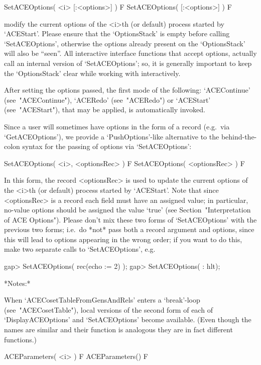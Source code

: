 \>SetACEOptions( <i> [:<options>] ) F
\>SetACEOptions( [:<options>] ) F

modify the current options of the <i>th (or default)  process  started
by `ACEStart'. Please ensure that the `OptionsStack' is  empty  before
calling `SetACEOptions', otherwise the options already present on  the
`OptionsStack' will also be ``seen''. All interactive {\ACE} interface
functions that accept options, actually call an  internal  version  of
`SetACEOptions';  so,  it  is  generally   important   to   keep   the
`OptionsStack' clear while working with {\ACE} interactively.

After setting the options passed, the first  mode  of  the  following:
`ACEContinue'  (see~"ACEContinue"),   `ACERedo'   (see~"ACERedo")   or
`ACEStart' (see~"ACEStart"), that may  be  applied,  is  automatically
invoked.

Since a user will sometimes have options  in  the  form  of  a  record
(e.g.~via   `GetACEOptions'),   we   provide   a    `PushOptions'-like
alternative to the behind-the-colon syntax for the passing of  options
via `SetACEOptions':

\>SetACEOptions( <i>, <optionsRec> ) F
\>SetACEOptions( <optionsRec> ) F

In this form, the record <optionsRec> is used to  update  the  current
options of the <i>th (or default) process started by `ACEStart'.  Note
that since <optionsRec> is a record each field must have  an  assigned
value; in particular, no-value {\ACE} options should be  assigned  the
value `true' (see Section~"Interpretation  of  ACE  Options").  Please
don't mix these two forms of `SetACEOptions'  with  the  previous  two
forms; i.e.~do *not* pass both a record argument  and  options,  since
this will lead to options appearing in the wrong order; if you want to
do this, make two separate calls to `SetACEOptions', e.g.

\beginexample
gap> SetACEOptions( rec(echo := 2) );
gap> SetACEOptions( : hlt);
\endexample

*Notes:*

When    `ACECosetTableFromGensAndRels'    enters    a     `break'-loop
(see~"ACECosetTable"), local versions of the second form  of  each  of
`DisplayACEOptions' and `SetACEOptions' become available. (Even though
the names are similar and their function is analogous they are in fact
different functions.)

\>ACEParameters( <i> ) F
\>ACEParameters() F

